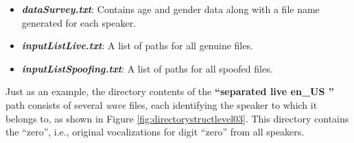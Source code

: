 \begin{itemize}
\item \textit{\textbf{dataSurvey.txt}}: Contains age and gender data along with a file name generated for each speaker.
\item \textit{\textbf{inputListLive.txt}}: A list of paths for all genuine files.
\item \textit{\textbf{inputListSpoofing.txt}}: A list of paths for all spoofed files.
\end{itemize}
Just as an example, the directory contents of the \textbf{``separated \textfractionsolidus live \textfractionsolidus en\_US ''} path consists of several \textit{wave} files, each identifying the speaker to which it belongs to, as shown in Figure \ref{fig:directorystructlevel03}. This directory contains the ``zero'', i.e., original vocalizations for digit ``zero'' from all speakers.
